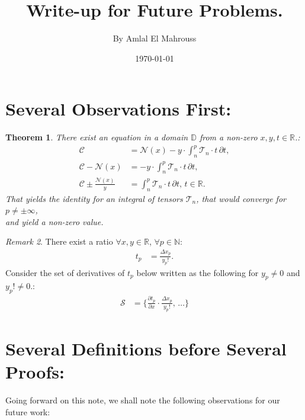 \documentclass[10pt]{article}
\title{%
	\vspace{-1.5em}%
	\large\textbf{Write-up for Future Problems.}%
}
\author{By Amlal El Mahrouss}
\date{\today}
\theoremstyle{plain}
\newtheorem{theorem}{Theorem}[section]
\theoremstyle{definition}
\theoremstyle{remark}
\newtheorem{remark}[theorem]{Remark}
\begin{document}
	
	\maketitle
	\tableofcontents
	\newpage

\section{Several Observations First:}

\begin{theorem}
There exist an equation in a domain $\mathbb{D}$ from a non-zero $x, y, t \in \mathbb{R}$.:
\begin{align*}
    \mathcal{C} &= \mathcal{N}(x) - y \cdot \int_{n}^{p} \mathcal{T}_{n} \cdot t \, \partial t,\\
    \mathcal{C} - \mathcal{N}(x) &= -y \cdot \int_{n}^{p} \mathcal{T}_{n} \cdot t \, \partial t,\\
    \mathcal{C} \pm \frac{\mathcal{N}(x)}{y} &= \int_{n}^{p} \mathcal{T}_{n} \cdot t \, \partial t, \, t \in \mathbb{R}.
\end{align*}
That yields the identity for an integral of tensors $\mathcal{T}_n$, that would converge for $p \neq \pm \infty$,\\ and yield a non-zero value.
\end{theorem}

\begin{remark}
There exist a ratio $\forall x, y \in \mathbb{R}$, $\forall p \in \mathbb{N}$:
\begin{align*}
	t_p &= \frac{\Delta x_p}{y_p!}.
\end{align*}
Consider the set of derivatives of $t_p$ below written as the following for $y_p \neq 0$ and $y_p! \neq 0$.:
\begin{align*}
	\mathcal{S} &= \{ \frac{\partial t_p}{\partial x} \cdot \frac{\Delta x_p}{y_p!}, \, \dots \}
\end{align*}
\end{remark}

\section{Several Definitions before Several Proofs:}

Going forward on this note, we shall note the following observations for our future work:
\end{document}
